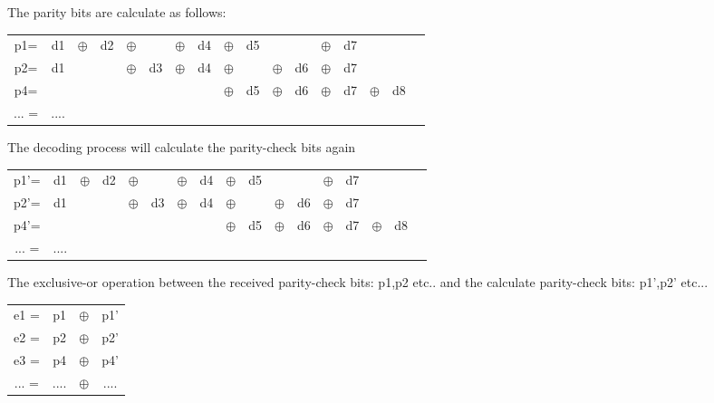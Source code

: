 The parity bits are calculate as follows:

\begin{table}[!ht]
        \begin{center}
                \begin{tabular}{c c c c c c c c c c c c c c c c c}
	         p1= & d1 &$\oplus$& d2 &$\oplus$&    &$\oplus$& d4 &$\oplus$& d5 &          &    &$\oplus$& d7 &          &     \\
		 p2= & d1 &        &    &$\oplus$& d3 &$\oplus$& d4 &$\oplus$&    & $\oplus$ & d6 &$\oplus$& d7 &          &      \\
	         p4= &    &        &    &        &    &        &    &$\oplus$& d5 & $\oplus$ & d6 &$\oplus$& d7 & $\oplus$ & d8   \\
... = & .... &&&&&&&&&&& \\
	
		 		\end{tabular}   
	\end{center}
\end{table}

The decoding process will calculate the parity-check bits again 

\begin{table}[!ht]
        \begin{center}
                \begin{tabular}{c c c c c c c c c c c c c c c c c}
	         p1'= & d1 &$\oplus$& d2 &$\oplus$&    &$\oplus$& d4 &$\oplus$& d5 &          &    &$\oplus$& d7 &          &     \\
		 p2'= & d1 &        &    &$\oplus$& d3 &$\oplus$& d4 &$\oplus$&    & $\oplus$ & d6 &$\oplus$& d7 &          &      \\
	         p4'= &    &        &    &        &    &        &    &$\oplus$& d5 & $\oplus$ & d6 &$\oplus$& d7 & $\oplus$ & d8   \\
... = & .... &&&&&&&&&&& \\
	
		 		\end{tabular}   
	\end{center}
\end{table}

The exclusive-or operation between the received parity-check  bits: p1,p2 etc.. and the calculate parity-check  bits: p1',p2' etc... 

\begin{table}[!ht]
        \begin{center}
                \begin{tabular}{cccc}
         e1 = & p1 &$\oplus$& p1' \\
				 e2 = & p2 &$\oplus$& p2' \\
			   e3 = & p4 &$\oplus$& p4' \\
				... = & ....  &$\oplus$& .... \\
		 		\end{tabular}   
	\end{center}
\end{table}

